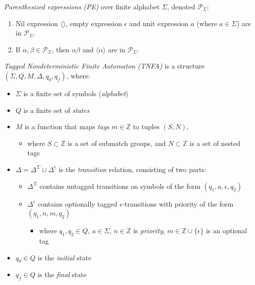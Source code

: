 \documentclass[AMA,STIX1COL]{WileyNJD-v2}
\newcommand{\Xl}{\langle}
\newcommand{\Xr}{\rangle}
\newcommand{\Xm}{\langle\!\rangle}
\newcommand{\XP}{\mathcal{P}}
\newcommand{\YZ}{\mathbb{Z}}
\begin{document}
    \begin{definition}
    \emph{Parenthesized expressions (PE)} over finite alphabet $\Sigma$, denoted $\XP_\Sigma$:
    \begin{enumerate}
        \item
            Nil expression $\Xm$,
            empty expression $\epsilon$ and
            unit expression $a$ (where $a \in \Sigma$)
            are in $\XP_\Sigma$.
        \item If $\alpha, \beta \in \XP_\Sigma$, then
            $\alpha \beta$ and
            $\Xl \alpha \Xr$
            are in $\XP_\Sigma$.
    \end{enumerate}
    \end{definition}


    \begin{definition} \label{def_tnfa}
    \emph{Tagged Nondeterministic Finite Automaton (TNFA)}
    is a structure $(\Sigma, Q, M, \Delta, q_0, q_f)$, where:
    \begin{itemize}
        \item[] $\Sigma$ is a finite set of symbols (\emph{alphabet})
        \item[] $Q$ is a finite set of \emph{states}
        \item[] $M$ is a function that maps \emph{tags} $m \in \YZ$ to tuples $(S, N)$,
        \begin{itemize}
            \item[] where $S \subset \YZ$ is a set of submatch groups,
                and $N \subset \YZ$ is a set of nested tags
        \end{itemize}
        \item[] $\Delta = \Delta^\Sigma \sqcup \Delta^\epsilon$ is the \emph{transition} relation,
            consisting of two parts:
        \begin{itemize}
            \item[] $\Delta^\Sigma$ contains untagged transitions on symbols of the form $(q_1, a, \epsilon, q_2)$
            \item[] $\Delta^\epsilon$ contains optionally tagged $\epsilon$-transitions with priority of the form $(q_1, n, m, q_2)$
            \begin{itemize}
                \item[] where $q_1, q_2 \in Q$,
                $a \in \Sigma$,
                $n \in \YZ$ is \emph{priority},
                $m \in \YZ \cup \{\epsilon\}$ is an optional tag
            \end{itemize}
        \end{itemize}
        \item[] $q_0 \in Q$ is the \emph{initial} state
        \item[] $q_f \in Q$ is the \emph{final} state
    \end{itemize}
    \end{definition}
\end{document}
